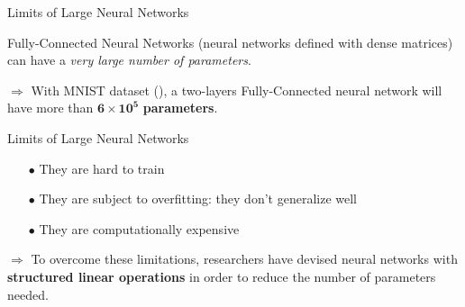 %
%
%
%



\begin{frame}{Limits of Large Neural Networks}

  Fully-Connected Neural Networks (neural networks defined with dense matrices) can have a \emph{very large number of parameters}.

  $\Rightarrow$ With MNIST dataset (\cite{lecun1998gradient}), a two-layers Fully-Connected neural network will have more than $\mathbf{6 \times 10^5}$ \textbf{parameters}.

  \vspace{0.5cm}

  \begin{block}{Limits of Large Neural Networks}
    \begin{itemize}
      \small
      \item[$\bullet$] They are hard to train
      \item[$\bullet$] They are subject to overfitting: they don't generalize well
      \item[$\bullet$] They are computationally expensive 
    \end{itemize}
  \end{block}
  
  $\Rightarrow$ To overcome these limitations, researchers have devised neural networks with \textbf{structured linear operations} in order to reduce the number of parameters needed.

\end{frame}



